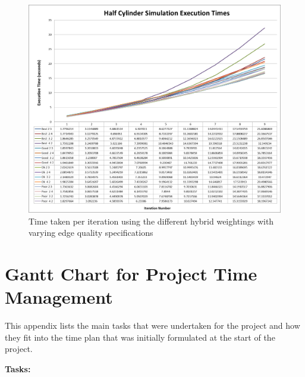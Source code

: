 \begin{figure}[H]
  \centerline{\includegraphics[width=120mm, scale=0.5]{../Graphics/HalfCylinder/ExecutionTimes.png}}
  \caption{Time taken per iteration using the different hybrid weightings with varying edge quality specifications}
\end{figure}

\newpage

\section{Gantt Chart for Project Time Management}
This appendix lists the main tasks that were undertaken for the project and how they fit into the time plan that was initially formulated at the start of the project.

\noindent
\textbf{Tasks:}

